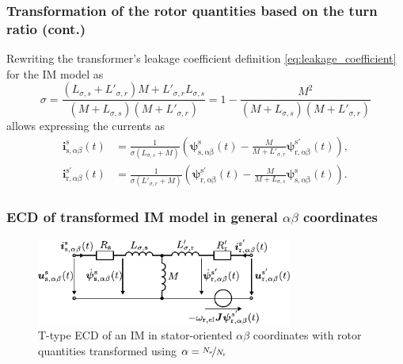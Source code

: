\begin{frame}
	\frametitle{Transformation of the rotor quantities based on the turn ratio (cont.)}
    Rewriting the transformer's leakage coefficient definition \eqref{eq:leakage_coefficient} for the IM model as
    \begin{equation}
        \sigma = \frac{(L_{\sigma,s}+L'_{\sigma,r})M + L'_{\sigma,r}L_{\sigma,s}}{(M+L_{\sigma,s})(M + L'_{\sigma,r})} = 1 - \frac{M^2}{(M+L_{\sigma,s})(M + L'_{\sigma,r})}
    \end{equation}
    allows expressing the currents as
    \begin{align}
        \bm{i}^\mathrm{s}_{\mathrm{s},\alpha\beta}(t) &= \frac{1}{\sigma(L_{\sigma,s} + M)}\left(\bm{\psi}^\mathrm{s}_\mathrm{s,\alpha\beta}(t)- \frac{M}{M+L'_{\sigma,r}}\bm{\psi}^\mathrm{s'}_\mathrm{r,\alpha\beta}(t)\right),\\
        \bm{i}^{\mathrm{s}'}_{\mathrm{r},\alpha\beta}(t) &= \frac{1}{\sigma(L'_{\sigma,r} + M)}\left(\bm{\psi}^{\mathrm{s}'}_\mathrm{r,\alpha\beta}(t)- \frac{M}{M+L_{\sigma,s}}\bm{\psi}^\mathrm{s}_\mathrm{s,\alpha\beta}(t)\right).
    \end{align}
\end{frame}

\begin{frame}
	\frametitle{ECD of transformed IM model in general $\alpha\beta$ coordinates}
    \begin{figure}
        \centering
		\includegraphics[width=0.75\textwidth]{fig/lec06/IM_T_ECD_alpha_beta.pdf}
        \caption{T-type ECD of an IM in stator-oriented $\alpha\beta$ coordinates with rotor quantities transformed using $\alpha = \nicefrac{N_\mathrm{s}}{N_\mathrm{r}}$}
		\label{fig:IM_T_ECD_alpha_beta}
    \end{figure}
\end{frame}

